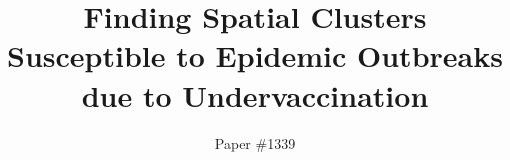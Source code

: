 \documentclass[sigconf]{aamas}  %
\begin{document}
\title{Finding Spatial Clusters Susceptible to Epidemic Outbreaks due to Undervaccination}  %


\author{Paper \#1339}  %

%
%
%
%
%
%
%
%
\end{document}

